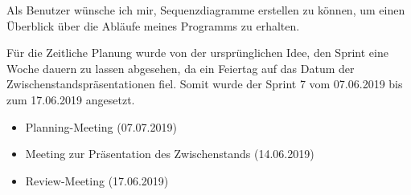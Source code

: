 Als Benutzer wünsche ich mir, Sequenzdiagramme erstellen zu können, um einen Überblick über die Abläufe meines Programms zu erhalten.
\nsecend
\nsecend%
\nsecend %

Für die Zeitliche Planung wurde von der ursprünglichen Idee, den Sprint eine Woche dauern zu lassen abgesehen, da ein Feiertag auf das Datum der Zwischenstandspräsentationen fiel. Somit wurde der Sprint 7 vom 07.06.2019 bis zum 17.06.2019 angesetzt.
\nsecend%

\begin{itemize}
\item Planning-Meeting (07.07.2019)
\item Meeting zur Präsentation des Zwischenstands (14.06.2019)
\item Review-Meeting (17.06.2019)
\end{itemize}
\nsecend%

